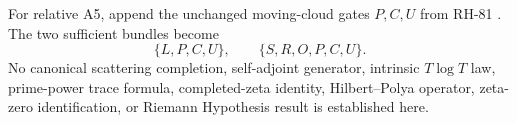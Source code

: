 \documentclass[11pt]{article}
\theoremstyle{remark}
\begin{document}
For relative A5, append the unchanged moving-cloud gates $P,C,U$ from RH-81
\citep{WangRouteReview2026}.  The two sufficient bundles become
\[
 \{L,P,C,U\},\qquad\{S,R,O,P,C,U\}.
\]
No canonical scattering completion, self-adjoint generator, intrinsic
$T\log T$ law, prime-power trace formula, completed-zeta identity,
Hilbert--Polya operator, zeta-zero identification, or Riemann Hypothesis
result is established here.



\end{document}
